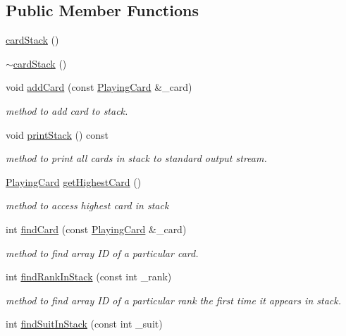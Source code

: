 \subsection*{Public Member Functions}
\begin{DoxyCompactItemize}
\item 
\hyperlink{classcardStack_ac423c45c944d35af268d5e2f7051d88f}{card\-Stack} ()
\item 
\hyperlink{classcardStack_a4149feb89fe3e883c17da819269ef874}{$\sim$card\-Stack} ()
\item 
void \hyperlink{classcardStack_acd88e764e2871f8362d36f916a3f5d5e}{add\-Card} (const \hyperlink{classPlayingCard}{Playing\-Card} \&\-\_\-card)
\begin{DoxyCompactList}\small\item\em method to add card to stack. \end{DoxyCompactList}\item 
void \hyperlink{classcardStack_ac2f3ea0eeddfad56a602597dc88d158d}{print\-Stack} () const 
\begin{DoxyCompactList}\small\item\em method to print all cards in stack to standard output stream. \end{DoxyCompactList}\item 
\hyperlink{classPlayingCard}{Playing\-Card} \hyperlink{classcardStack_ac905f0caffa958349f3bee6367133e65}{get\-Highest\-Card} ()
\begin{DoxyCompactList}\small\item\em method to access highest card in stack \end{DoxyCompactList}\item 
int \hyperlink{classcardStack_a29ea492190b96147f9d9a7097279505d}{find\-Card} (const \hyperlink{classPlayingCard}{Playing\-Card} \&\-\_\-card)
\begin{DoxyCompactList}\small\item\em method to find array I\-D of a particular card. \end{DoxyCompactList}\item 
int \hyperlink{classcardStack_a639fe6ff39303f2654de3bdcdaf85707}{find\-Rank\-In\-Stack} (const int \-\_\-rank)
\begin{DoxyCompactList}\small\item\em method to find array I\-D of a particular rank the first time it appears in stack. \end{DoxyCompactList}\item 
int \hyperlink{classcardStack_aabfa328b26f8d79b211278e691e6bfb4}{find\-Suit\-In\-Stack} (const int \-\_\-suit)

\end{DoxyCompactItemize}
